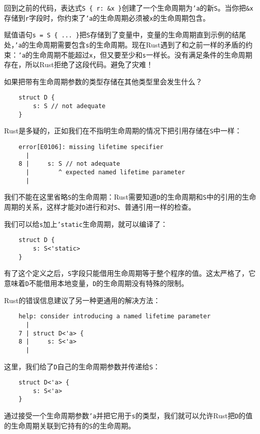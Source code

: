 回到之前的代码，表达式\texttt{S \{ r: \&x \}}创建了一个生命周期为\texttt{'a}的新\texttt{S}。当你把\texttt{\&x}存储到\texttt{r}字段时，你约束了\texttt{'a}的生命周期必须被\texttt{x}的生命周期包含。

赋值语句\texttt{s = S \{ ... \}}把\texttt{S}存储到了变量中，变量的生命周期直到示例的结尾处，\texttt{'a}的生命周期需要包含\texttt{s}的生命周期。现在Rust遇到了和之前一样的矛盾的约束：\texttt{'a}的生命周期不能超过\texttt{x}，但又要至少和\texttt{s}一样长。没有满足条件的生命周期存在，所以Rust拒绝了这段代码。避免了灾难！

如果把带有生命周期参数的类型存储在其他类型里会发生什么？
\begin{verbatim}
    struct D {
        s: S // not adequate
    }
\end{verbatim}

Rust是多疑的，正如我们在不指明生命周期的情况下把引用存储在\texttt{S}中一样：
\begin{verbatim}
    error[E0106]: missing lifetime specifier
      |
    8 |     s: S // not adequate
      |        ^ expected named lifetime parameter
      |
\end{verbatim}

我们不能在这里省略\texttt{S}的生命周期：Rust需要知道\texttt{D}的生命周期和\texttt{S}中的引用的生命周期的关系，这样才能对\texttt{D}进行和对\texttt{S}、普通引用一样的检查。

我们可以给\texttt{s}加上\texttt{'static}生命周期，就可以编译了：
\begin{verbatim}
    struct D {
        s: S<'static>
    }
\end{verbatim}

有了这个定义之后，\texttt{S}字段只能借用生命周期等于整个程序的值。这太严格了，它意味着\texttt{D}不能借用本地变量，\texttt{D}的生命周期没有特殊的限制。

Rust的错误信息建议了另一种更通用的解决方法：
\begin{verbatim}
    help: consider introducing a named lifetime parameter
      |
    7 | struct D<'a> {
    8 |     s: S<'a>
      |
\end{verbatim}

这里，我们给了\texttt{D}自己的生命周期参数并传递给\texttt{S}：
\begin{verbatim}
    struct D<'a> {
        s: S<'a>
    }
\end{verbatim}

通过接受一个生命周期参数\texttt{'a}并把它用于\texttt{s}的类型，我们就可以允许Rust把\texttt{D}的值的生命周期关联到它持有的\texttt{S}的生命周期。


